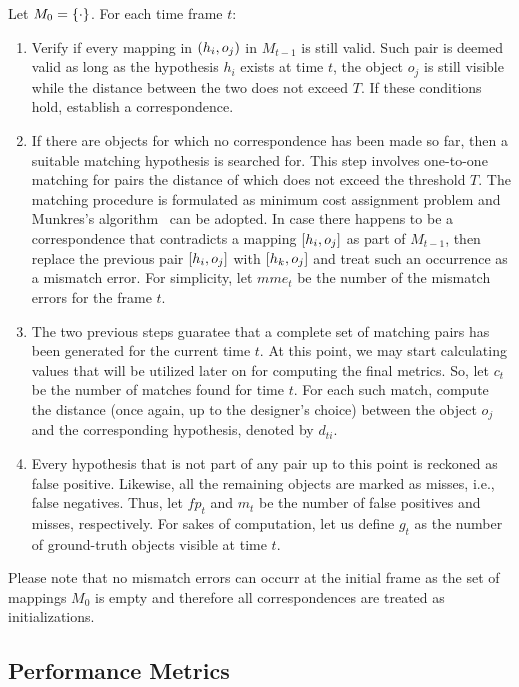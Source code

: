 Let $M_0 = \left\{ {\cdot} \right\}$. For each time frame $t$:
\begin{enumerate}
    \item Verify if every mapping in $\left( {h_i, o_j} \right)$ in $M_{t - 1}$ is still valid. Such pair is deemed valid as long as the hypothesis $h_i$ exists at time $t$, the object $o_j$ is still visible while the distance between the two does not exceed $T$. If these conditions hold, establish a correspondence.
    \item If there are objects for which no correspondence has been made so far, then a suitable matching hypothesis is searched for. This step involves one-to-one matching for pairs the distance of which does not exceed the threshold $T$. The matching procedure is formulated as minimum cost assignment problem and Munkres's algorithm~\cite{munkres1957assignment} can be adopted. In case there happens to be a correspondence that contradicts a mapping $\left[ {h_i, o_j} \right]$ as part of $M_{t - 1}$, then replace the previous pair $\left[ {h_i, o_j} \right]$ with $\left[ {h_k, o_j} \right]$ and treat such an occurrence as a mismatch error. For simplicity, let $mme_t$ be the number of the mismatch errors for the frame $t$.
    \item The two previous steps guaratee that a complete set of matching pairs has been generated for the current time $t$. At this point, we may start calculating values that will be utilized later on for computing the final metrics. So, let $c_t$ be the number of matches found for time $t$. For each such match, compute the distance (once again, up to the designer's choice) between the object $o_j$ and the corresponding hypothesis, denoted by $d_{ti}$.
    \item Every hypothesis that is not part of any pair up to this point is reckoned as false positive. Likewise, all the remaining objects are marked as misses, i.e., false negatives. Thus, let $fp_t$ and $m_t$ be the number of false positives and misses, respectively. For sakes of computation, let us define $g_t$ as the number of ground-truth objects visible at time $t$.
\end{enumerate}

Please note that no mismatch errors can occurr at the initial frame as the set of mappings $M_0$ is empty and therefore all correspondences are treated as initializations.

\subsection{Performance Metrics}

